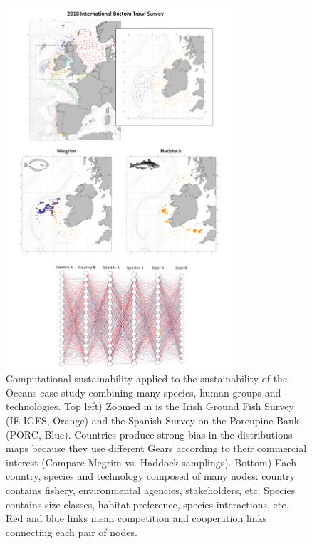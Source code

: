 \documentclass[12pt,a4paper]{article}
\begin{document}
\begin{figure}[H]
	 \centering
	 \includegraphics[width = 0.75\textwidth]{casestudy.pdf}
	 \caption{Computational sustainability applied to the sustainability of the Oceans case study combining many species, human groups and technologies. Top left) Zoomed in is the Irish Ground Fish Survey (IE-IGFS, Orange) and the Spanish Survey on the Porcupine Bank (PORC, Blue). Countries produce strong bias in the distributions maps because they use different Gears according to their commercial interest (Compare Megrim vs. Haddock samplings). Bottom) Each country, species and technology composed of many nodes: country contains fishery, environmental agencies, stakeholders, etc. Species contains size-classes, habitat preference, species interactions, etc. Red and blue links mean competition and cooperation links connecting each pair of nodes.}
\end{figure}
\end{document}
